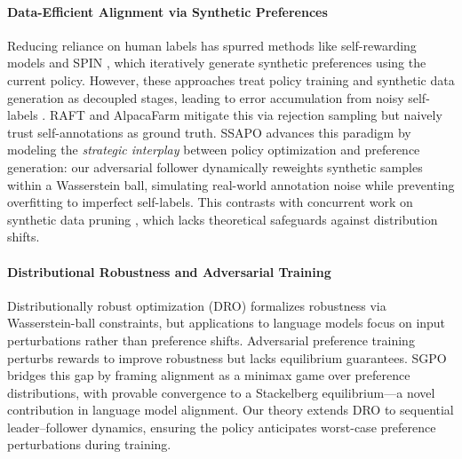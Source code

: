 \paragraph{Data-Efficient Alignment via Synthetic Preferences}
Reducing reliance on human labels has spurred methods like self-rewarding models \citep{Yuan2024Self-RewardingLM} and SPIN \citep{spa}, which iteratively generate synthetic preferences using the current policy. However, these approaches treat policy training and synthetic data generation as decoupled stages, leading to error accumulation from noisy self-labels \citep{Pal2024BeyondSynthetic}. RAFT \citep{Dong2024Raft} and AlpacaFarm \citep{Dubois2024AlpacaFarm} mitigate this via rejection sampling but naively trust self-annotations as ground truth. SSAPO advances this paradigm by modeling the \emph{strategic interplay} between policy optimization and preference generation: our adversarial follower dynamically reweights synthetic samples within a Wasserstein ball, simulating real-world annotation noise while preventing overfitting to imperfect self-labels. This contrasts with concurrent work on synthetic data pruning \citep{Guo2024SyntheticDP}, which lacks theoretical safeguards against distribution shifts.

\paragraph{Distributional Robustness and Adversarial Training}
Distributionally robust optimization (DRO) \citep{Esfahani2018DataDrivenDR} formalizes robustness via Wasserstein-ball constraints, but applications to language models \citep{Pang2024TextGrad} focus on input perturbations rather than preference shifts. Adversarial preference training \citep{Zhu2023FightingFI} perturbs rewards to improve robustness but lacks equilibrium guarantees. SGPO bridges this gap by framing alignment as a minimax game over preference distributions, with provable convergence to a Stackelberg equilibrium—a novel contribution in language model alignment. Our theory extends DRO to sequential leader--follower dynamics, ensuring the policy anticipates worst-case preference perturbations during training.